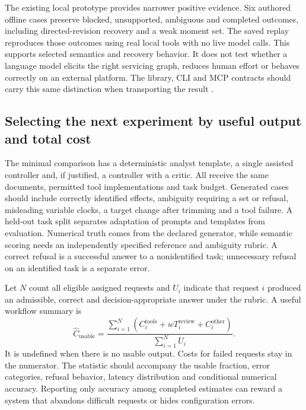The existing local prototype provides narrower positive evidence. Six authored
offline cases preserve blocked, unsupported, ambiguous and completed outcomes,
including directed-revision recovery and a weak moment set. The saved replay
reproduces those outcomes using real local tools with no live model calls.
This supports selected semantics and recovery behavior. It does not test
whether a language model elicits the right servicing graph, reduces human
effort or behaves correctly on an external platform. The library, CLI and MCP
contracts should carry this same distinction when transporting the result
\cite{exec13_architecture_local}.

\subsection{Selecting the next experiment by useful output and total cost}

The minimal comparison has a deterministic analyst template, a single assisted
controller and, if justified, a controller with a critic. All receive the same
documents, permitted tool implementations and task budget. Generated cases
should include correctly identified effects, ambiguity requiring a set or
refusal, misleading variable clocks, a target change after trimming and a tool
failure. A held-out task split separates adaptation of prompts and templates
from evaluation. Numerical truth comes from the declared generator, while
semantic scoring needs an independently specified reference and ambiguity
rubric. A correct refusal is a successful answer to a nonidentified task;
unnecessary refusal on an identified task is a separate error.

Let $N$ count all eligible assigned requests and $U_i$ indicate that request
$i$ produced an admissible, correct and decision-appropriate answer under the
rubric. A useful workflow summary is
\begin{equation}
 \widehat C_{\mathrm{usable}}=
 \frac{\sum_{i=1}^N(C_i^{\mathrm{tools}}+wT_i^{\mathrm{review}}
                         +C_i^{\mathrm{other}})}{\sum_{i=1}^N U_i}.
 \label{exec13:architecture-cost}
\end{equation}
It is undefined when there is no usable output. Costs for failed requests stay
in the numerator. The statistic should accompany the usable fraction, error
categories, refusal behavior, latency distribution and conditional numerical
accuracy. Reporting only accuracy among completed estimates can reward a system
that abandons difficult requests or hides configuration errors.

